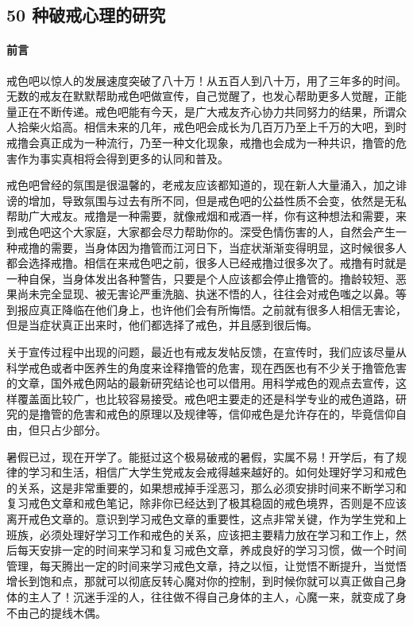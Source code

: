 \subsection{50 种破戒心理的研究}

\paragraph*{前言}

戒色吧以惊人的发展速度突破了八十万！从五百人到八十万，用了三年多的时间。无数的戒友在默默帮助戒色吧做宣传，自己觉醒了，也发心帮助更多人觉醒，正能量正在不断传递。戒色吧能有今天，是广大戒友齐心协力共同努力的结果，所谓众人拾柴火焰高。相信未来的几年，戒色吧会成长为几百万乃至上千万的大吧，到时戒撸会真正成为一种流行，乃至一种文化现象，戒撸也会成为一种共识，撸管的危害作为事实真相将会得到更多的认同和普及。

戒色吧曾经的氛围是很温馨的，老戒友应该都知道的，现在新人大量涌入，加之诽谤的增加，导致氛围与过去有所不同，但是戒色吧的公益性质不会变，依然是无私帮助广大戒友。戒撸是一种需要，就像戒烟和戒酒一样，你有这种想法和需要，来到戒色吧这个大家庭，大家都会尽力帮助你的。深受色情伤害的人，自然会产生一种戒撸的需要，当身体因为撸管而江河日下，当症状渐渐变得明显，这时候很多人都会选择戒撸。相信在来戒色吧之前，很多人已经戒撸过很多次了。戒撸有时就是一种自保，当身体发出各种警告，只要是个人应该都会停止撸管的。撸龄较短、恶果尚未完全显现、被无害论严重洗脑、执迷不悟的人，往往会对戒色嗤之以鼻。等到报应真正降临在他们身上，也许他们会有所悔悟。之前就有很多人相信无害论，但是当症状真正出来时，他们都选择了戒色，并且感到很后悔。

关于宣传过程中出现的问题，最近也有戒友发帖反馈，在宣传时，我们应该尽量从科学戒色或者中医养生的角度来诠释撸管的危害，现在西医也有不少关于撸管危害的文章，国外戒色网站的最新研究结论也可以借用。用科学戒色的观点去宣传，这样覆盖面比较广，也比较容易接受。戒色吧主要走的还是科学专业的戒色道路，研究的是撸管的危害和戒色的原理以及规律等，信仰戒色是允许存在的，毕竟信仰自由，但只占少部分。

暑假已过，现在开学了。能挺过这个极易破戒的暑假，实属不易！开学后，有了规律的学习和生活，相信广大学生党戒友会戒得越来越好的。如何处理好学习和戒色的关系，这是非常重要的，如果想戒掉手淫恶习，那么必须安排时间来不断学习和复习戒色文章和戒色笔记，除非你已经达到了极其稳固的戒色境界，否则是不应该离开戒色文章的。意识到学习戒色文章的重要性，这点非常关键，作为学生党和上班族，必须处理好学习工作和戒色的关系，应该把主要精力放在学习和工作上，然后每天安排一定的时间来学习和复习戒色文章，养成良好的学习习惯，做一个时间管理，每天腾出一定的时间来学习戒色文章，持之以恒，让觉悟不断提升，当觉悟增长到饱和点，那就可以彻底反转心魔对你的控制，到时候你就可以真正做自己身体的主人了！沉迷手淫的人，往往做不得自己身体的主人，心魔一来，就变成了身不由己的提线木偶。

